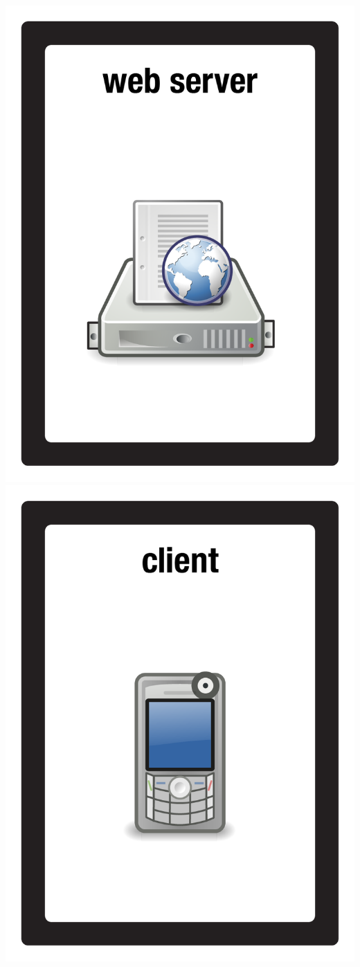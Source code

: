 \documentclass{letter}
\begin{document}
\includegraphics{patch/patch_web_server}
\includegraphics{patch/patch_client_mobile}
\end{document}

